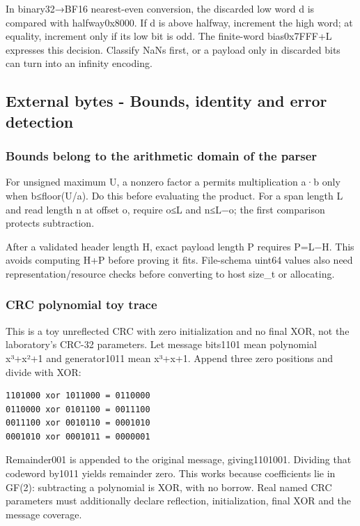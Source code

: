 In binary32→BF16 nearest-even conversion, the discarded low word d is compared with halfway0x8000. If d is above halfway, increment the high word; at equality, increment only if its low bit is odd. The finite-word bias0x7FFF+L expresses this decision. Classify NaNs first, or a payload only in discarded bits can turn into an infinity encoding.

\subsection{External bytes - Bounds, identity and error detection}\label{external-bytes---bounds-identity-and-error-detection}

\subsubsection{Bounds belong to the arithmetic domain of the parser}\label{bounds-belong-to-the-arithmetic-domain-of-the-parser}

For unsigned maximum U, a nonzero factor a permits multiplication a·b only when b≤floor(U/a). Do this before evaluating the product. For a span length L and read length n at offset o, require o≤L and n≤L−o; the first comparison protects subtraction.

After a validated header length H, exact payload length P requires P=L−H. This avoids computing H+P before proving it fits. File-schema uint64 values also need representation/resource checks before converting to host size\_t or allocating.

\subsubsection{CRC polynomial toy trace}\label{crc-polynomial-toy-trace}

This is a toy unreflected CRC with zero initialization and no final XOR, not the laboratory's CRC-32 parameters. Let message bits1101 mean polynomial x³+x²+1 and generator1011 mean x³+x+1. Append three zero positions and divide with XOR:

\begin{verbatim}
1101000 xor 1011000 = 0110000
0110000 xor 0101100 = 0011100
0011100 xor 0010110 = 0001010
0001010 xor 0001011 = 0000001
\end{verbatim}

Remainder001 is appended to the original message, giving1101001. Dividing that codeword by1011 yields remainder zero. This works because coefficients lie in GF(2): subtracting a polynomial is XOR, with no borrow. Real named CRC parameters must additionally declare reflection, initialization, final XOR and the message coverage.

